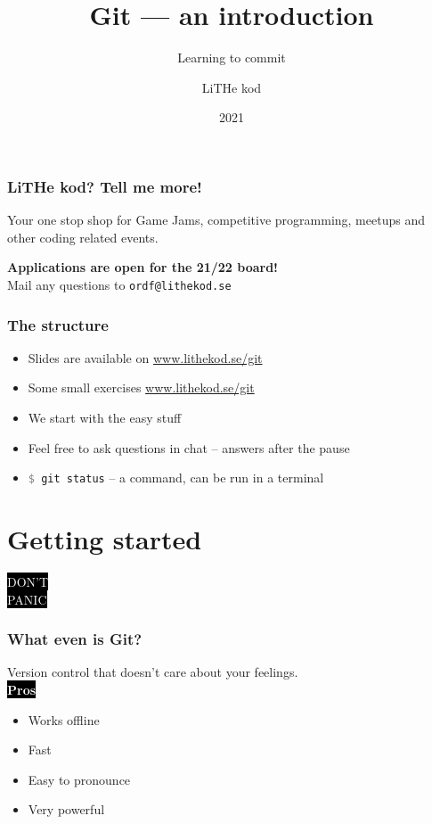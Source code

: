 \documentclass{beamer}
\title[Git]{Git --- an introduction}
\subtitle{Learning to commit}
\author{LiTHe kod}
\date{2021}
\newcommand{\keyword}[1]{\hspace{-1.0em}\colorbox{black}{\textcolor{white}{\textbf{#1}\vphantom{Ep}}}\vspace{0.2em}} %
\newcommand{\command}[1]{\texttt{\textcolor{gray}{\$} {#1}}}
\begin{document}
\frame{\titlepage}
\frame{\tableofcontents}


\begin{frame}[fragile]
  \frametitle{LiTHe kod? Tell me more!}
  Your one stop shop for Game Jams, competitive programming, meetups and other coding related events.

  \vspace{2.0em}
  \textbf{Applications are open for the 21/22 board!} \\
  Mail any questions to \texttt{ordf@lithekod.se} \\
\end{frame}

\begin{frame}[fragile]
  \frametitle{The structure}
  
  \begin{itemize}[<+->]
    \item Slides are available on \url{www.lithekod.se/git}
    \item Some small exercises \url{www.lithekod.se/git}
    \item We start with the easy stuff
    \item Feel free to ask questions in chat -- answers after the pause
    \item \command{git status} -- a command, can be run in a terminal
  \end{itemize}

\end{frame}

\section{Getting started}

\begin{frame}[fragile]
  \begin{center}
    \Huge \colorbox{black}{\textcolor{white}{DON'T}} \\
    \Huge \colorbox{black}{\textcolor{white}{PANIC}}
  \end{center}
\end{frame}

\begin{frame}[fragile]
  \frametitle{What even is Git?}

  Version control that doesn't care about your feelings. \\

  \vspace{1em}
  \keyword{Pros}
  \begin{itemize}
    \item Works offline
    \item Fast
    \item Easy to pronounce
    \item Very powerful
  \end{itemize}

\end{frame}
\end{document}

